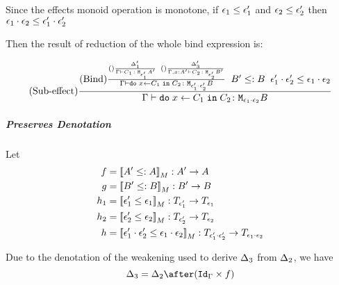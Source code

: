 {                Since the effects monoid operation is monotone, if $\epsilon_1\leq\epsilon_1'$ and $\epsilon_2\leq\epsilon_2'$ then $\epsilon_1\cdot\epsilon_2 \leq \epsilon_1'\cdot\epsilon_2'$
                


                Then the result of reduction of the whole bind expression is:


                \begin{equation}
                    (\text{Sub-effect}) \frac{
                        (\text{Bind}) \frac{
                            (\text{}) \frac{
                                \Delta'_1
                            }{
                                \Gamma \vdash C_1 \colon \texttt{M}_{\epsilon_1'}{A'}
                            }
                            \;\;
                            (\text{}) \frac{
                                \Delta'_3
                            }{
                                \Gamma, x: A' \vdash C_2 \colon \texttt{M}_{\epsilon_2'}{B'}
                            }
                        }{
                        \Gamma \vdash \texttt{do}\; x \leftarrow C_1 \;\texttt{in}\; C_2 \colon \texttt{M}_{\epsilon_1'\cdot\epsilon_2'}{B}
                        }
                        \;\;
                        B' \leq: B
                        \;\;
                        \epsilon_1'\cdot\epsilon_2'\leq\epsilon_1\cdot\epsilon_2
                    }{
                        \Gamma \vdash \texttt{do}\; x \leftarrow C_1 \;\texttt{in}\; C_2 \colon \texttt{M}_{\epsilon_1\cdot\epsilon_2}{B}
                    }
                \end{equation}
                \subparagraph{Preserves Denotation}

                Let \begin{align}
                    f & = \deno{A' \subtype A}: A' \rightarrow A\\
                    g & = \deno{B' \subtype B}: B' \rightarrow B\\
                    h_1 & = \deno{\e_1' \subeffect \e_1} : \T{\e_1'}{} \rightarrow \T{\e_1}{} \\
                    h_2 & = \deno{\e_2'\subeffect \e_2}:\T{\e_2'}{} \rightarrow \T{\e_2}{}\\
                    h & = \deno{\e_1'\dot\e_2'\subeffect\e_1\dot\e_2}: \T{\e_1'\dot\e_2'}{}\rightarrow \T{\e_1\dot\e_2}{}
                \end{align}

                Due to the denotation of the weakening used to derive $\Delta_3$ from $\Delta_2$, we have 
                \begin{equation}
                    \D_3 = \D_2\after(\idg\times f)
                \end{equation}

}
